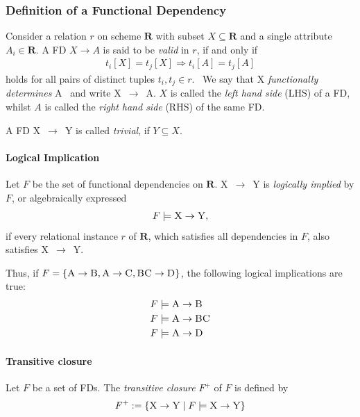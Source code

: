 \subsubsection{Definition of a Functional Dependency}
Consider a relation \(r\) on scheme \(\boldsymbol{R}\) with subset \(X \subseteq \boldsymbol{R}\) and a single attribute \(A_i \in \boldsymbol{R}\).
A FD \(X \to A\) is said to be \emph{valid} in \(r\), if and only if
\begin{align}
    t_i[X] = t_j[X] \Rightarrow t_i[A] = t_j[A] \label{eq:fd-condition}
\end{align}
holds for all pairs of distinct tuples \(t_i,t_j \in r\).~\cite[p.~21]{ABE19}
We say that \textsc{X} \emph{functionally determines} \textsc{A}~\cite[p.~43]{MAI83} and write \textsc{X}~\( \rightarrow \)~\textsc{A}.
\(X\) is called the \emph{left hand side} (LHS) of a FD, whilst \(A\) is called the \emph{right hand side} (RHS) of the same FD.

A FD \textsc{X}~\( \rightarrow \)~\textsc{Y} is called \emph{trivial}, if \( Y \subseteq X \).\cite[p.~163]{STU16}

\paragraph{Logical Implication} Let \( F \) be the set of functional dependencies on \( \boldsymbol{R} \).
\textsc{X}~\( \rightarrow  \)~\textsc{Y} is \emph{logically implied} by \( F \), or algebraically expressed
\begin{align}
    F \models \textsc{X} \rightarrow \textsc{Y},
\end{align}
if every relational instance \( r \) of \( \boldsymbol{R} \), which satisfies all dependencies in \( F \), also satisfies \textsc{X}~\( \rightarrow \)~\textsc{Y}.~\cite[p.~166]{STU16}

Thus, if \( F = \{ \textsc{A} \rightarrow \textsc{B}, \textsc{A} \rightarrow \textsc{C}, \textsc{BC} \rightarrow \textsc{D} \} \), the following logical implications are true:
\begin{align*}
    &F \models \textsc{A} \rightarrow \textsc{B} \\
    &F \models \textsc{A} \rightarrow \textsc{BC} \\
    &F \models \textsc{A} \rightarrow \textsc{D}
\end{align*}

\paragraph{Transitive closure} Let \( F \) be a set of FDs.
The \emph{transitive closure} \( F^{+} \) of \( F \) is defined by
\begin{align}\label{eq:transitive-closure}
    F^{+} := \{ \textsc{X} \rightarrow \textsc{Y} \mid F \models \textsc{X} \rightarrow \textsc{Y} \}
\end{align}

